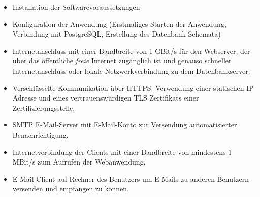 \begin{itemize}
	\item Installation der Softwarevoraussetzungen

	\item Konfiguration der Anwendung (Erstmaliges Starten der Anwendung, Verbindung mit PostgreSQL, Erstellung des Datenbank Schemata)

	\item Internetanschluss mit einer Bandbreite von 1 GBit/s für den Webserver, der über das öffentliche \emph{freie} Internet zugänglich ist und genauso schneller Internetanschluss oder lokale Netzwerkverbindung zu dem Datenbankserver.

	\item Verschlüsselte Kommunikation über HTTPS. Verwendung einer statischen IP-Adresse und eines vertrauenswürdigen TLS Zertifikats einer Zertifizierungsstelle.

	\item SMTP E-Mail-Server mit E-Mail-Konto zur Versendung automatisierter Benachrichtigung.

	\item Internetverbindung der Clients mit einer Bandbreite von mindestens 1 MBit/s zum Aufrufen der Webanwendung.

	\item E-Mail-Client auf Rechner des Benutzers um E-Mails zu anderen Benutzern versenden und empfangen zu können.
\end{itemize}

